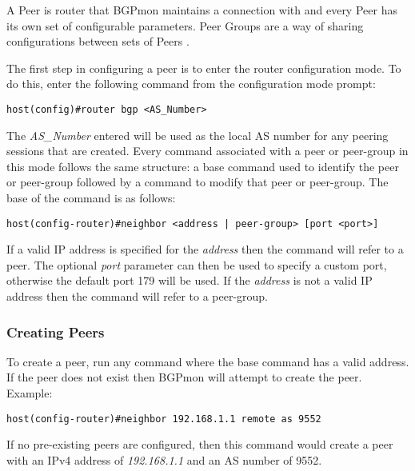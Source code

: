 A Peer is router that BGPmon maintains a connection with and every Peer has its own set of configurable parameters.  Peer Groups are a way of sharing configurations between sets of Peers .

The first step in configuring a peer is to enter the router configuration mode.  To do this, enter the following command from the configuration mode prompt:\\

\begin{Verbatim}[frame=single]
host(config)#router bgp <AS_Number>
\end{Verbatim}

The \emph{AS\_Number} entered will be used as the local AS number for any peering sessions that are created. Every command associated with a peer or peer-group in this mode follows the same structure: a base command used to identify the peer or peer-group followed by a command to modify that peer or peer-group. The base of the command is as follows:\\

\begin{Verbatim}[frame=single]
host(config-router)#neighbor <address | peer-group> [port <port>]
\end{Verbatim}

If a valid IP address is specified for the \emph{address} then the command will refer to a peer.  The optional \emph{port} parameter can then be used to specify a custom port, otherwise the default port 179 will be used.  If the \emph{address} is not a valid IP address then the command will refer to a peer-group.


\subsubsection{Creating Peers}
\label{sec:configure:peers:create}

To create a peer, run any command where the base command has a valid address.  If the peer does not exist then BGPmon will attempt to create the peer.  Example:\\

\begin{Verbatim}[frame=single]
host(config-router)#neighbor 192.168.1.1 remote as 9552
\end{Verbatim}

If no pre-existing peers are configured, then this command would create a peer with an IPv4 address of \emph{192.168.1.1} and an AS number of 9552.

